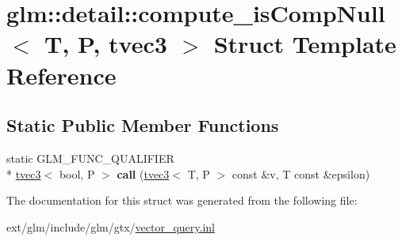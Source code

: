 \hypertarget{structglm_1_1detail_1_1compute__is_comp_null_3_01_t_00_01_p_00_01tvec3_01_4}{\section{glm\-:\-:detail\-:\-:compute\-\_\-is\-Comp\-Null$<$ T, P, tvec3 $>$ Struct Template Reference}
\label{structglm_1_1detail_1_1compute__is_comp_null_3_01_t_00_01_p_00_01tvec3_01_4}
}
\subsection*{Static Public Member Functions}
\begin{DoxyCompactItemize}
\item 
\hypertarget{structglm_1_1detail_1_1compute__is_comp_null_3_01_t_00_01_p_00_01tvec3_01_4_aeed450148ffffe117e96c998a31a78e6}{static G\-L\-M\-\_\-\-F\-U\-N\-C\-\_\-\-Q\-U\-A\-L\-I\-F\-I\-E\-R \\*
\hyperlink{structglm_1_1tvec3}{tvec3}$<$ bool, P $>$ {\bfseries call} (\hyperlink{structglm_1_1tvec3}{tvec3}$<$ T, P $>$ const \&v, T const \&epsilon)}\label{structglm_1_1detail_1_1compute__is_comp_null_3_01_t_00_01_p_00_01tvec3_01_4_aeed450148ffffe117e96c998a31a78e6}

\end{DoxyCompactItemize}


The documentation for this struct was generated from the following file\-:\begin{DoxyCompactItemize}
\item 
ext/glm/include/glm/gtx/\hyperlink{vector__query_8inl}{vector\-\_\-query.\-inl}\end{DoxyCompactItemize}
